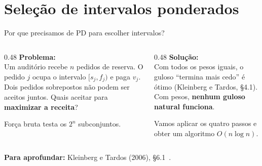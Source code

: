 \documentclass[aspectratio=169,xcolor=table]{beamer}
\newcommand{\fonte}[1]{%
  \vfill
  {\tiny\color{gray!55!black}\textbf{Para aprofundar:} #1\par}%
}
\begin{document}
\section{Seleção de intervalos ponderados}

\begin{frame}{Por que precisamos de PD para escolher intervalos?}
  \begin{columns}[T]
    \begin{column}{0.48\textwidth}
      \textbf{Problema:}\\[2pt]
      \scriptsize Um auditório recebe $n$ pedidos de reserva. O pedido $j$ ocupa o
      intervalo $[s_j, f_j)$ e paga $v_j$. Dois pedidos sobrepostos não podem ser
      aceitos juntos. Quais aceitar para \textbf{maximizar a receita}?
      \medskip

      Força bruta testa os $2^n$ subconjuntos.
    \end{column}
    \begin{column}{0.48\textwidth}
      \textbf{Solução:}\\[2pt]
      \scriptsize Com todos os pesos iguais, o guloso ``termina mais cedo'' é ótimo
      (Kleinberg e Tardos, \S 4.1). Com pesos, \textbf{nenhum guloso natural funciona}.
      \medskip

      Vamos aplicar os quatro passos e obter um algoritmo $O(n \log n)$.
    \end{column}
  \end{columns}
  \fonte{Kleinberg e Tardos (2006), \S 6.1~\cite{kleinberg2006algorithm}.}
\end{frame}
\end{document}
